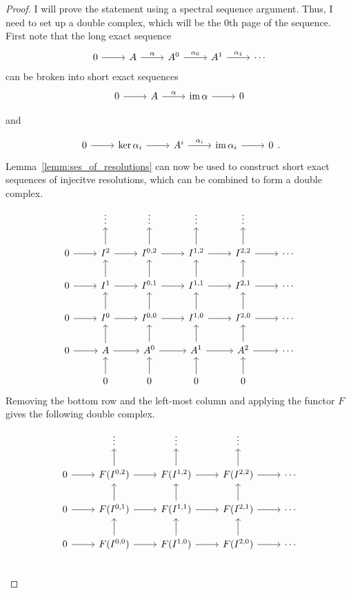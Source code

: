 \begin{proof}
  I will prove the statement using a spectral sequence argument.
  Thus, I need to set up a double complex, which will be the 0th page
  of the sequence. First note that the long exact sequence
  \[\begin{tikzcd}
      0\rar & A\rar{\alpha} & A^{0}\rar{\alpha_{0}} & A^{1}\rar{\alpha_{1}}
      & \cdots
    \end{tikzcd}\]
  can be broken into short exact sequences
  \[\begin{tikzcd}
      0\rar & A\rar{\alpha} & \im\alpha\rar & 0
    \end{tikzcd}\]
  \begin{center}
    and
  \end{center}
  \[\begin{tikzcd}
      0\rar & \ker\alpha_{i}\rar & A^{i}\rar{\alpha_{i}} & \im\alpha_{i}\rar
      & 0
    \end{tikzcd}.\]
  Lemma~\ref{lemm:ses_of_resolutions} can now be used to construct short
  exact sequences of injecitve resolutions, which can be combined to form
  a double complex.
  \[\begin{tikzcd}
      & \vdots & \vdots & \vdots & \vdots & \\
      0\rar & I^{2}\uar\rar & I^{0, 2}\uar\rar & I^{1, 2}\uar\rar
      & I^{2, 2}\uar\rar & \cdots \\
      0\rar & I^{1}\uar\rar & I^{0, 1}\uar\rar & I^{1, 1}\uar\rar
      & I^{2, 1}\uar\rar & \cdots \\
      0\rar & I^{0}\uar\rar & I^{0, 0}\uar\rar & I^{1, 0}\uar\rar
      & I^{2, 0}\uar\rar & \cdots \\
      0\rar & A\uar\rar & A^{0}\uar\rar & A^{1}\uar\rar & A^{2}\uar\rar
      & \cdots \\
      & 0\uar & 0\uar & 0\uar & 0\uar &
    \end{tikzcd}\]
  Removing the bottom row and the left-most column and applying the functor
  $F$ gives the following double complex.
  \[\begin{tikzcd}
      & \vdots & \vdots & \vdots & \\
      0\rar & F(I^{0,2})\uar\rar & F(I^{1, 2})\uar\rar
      & F(I^{2, 2})\uar\rar & \cdots \\
      0\rar & F(I^{0,1})\uar\rar & F(I^{1, 1})\uar\rar
      & F(I^{2, 1})\uar\rar & \cdots \\
      0\rar & F(I^{0,0})\uar\rar & F(I^{1, 0})\uar\rar
      & F(I^{2, 0})\uar\rar & \cdots \\

\end{tikzcd}\]
\end{proof}
